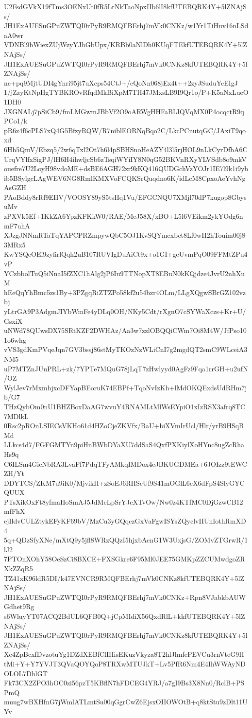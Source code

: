 U2FsdGVkX19fTms3OENxUt0fR5LrNkTaoNpxIIb6lI8kfUTEBQRK4Y+5lZNAjSs/
JH1ExAUESuGPuZWTQI0rPyR9RMQFBErhj7mVk0CNKz/w1Yr1TiHuv16nLSdaA0wr
VDNBl9bWiexZUjWzyYJhGbUpx/KRBb0aNlDh0KUqFTEkfUTEBQRK4Y+5lZNAjSs/
JH1ExAUESuGPuZWTQI0rPyR9RMQFBErhj7mVk0CNKz8kfUTEBQRK4Y+5lZNAjSs/
nc+pq9MjtUDI4gYnri95jt7uXeps54CtJ+/eQoNn068jEx4t++2zyJSuduYcEIgJ
1/jZzyKtNpHgTYBKROvRfqdMkBiXpM7TH47JMxsLB9I9Qr1o/P+K5aNxLueO1DH0
JXGNALj7pSiCb9/fmLMGwmJBbVf2O9oARWgHHFaBLIQVqMX0P4ocqctR9qPCo1/k
pR6z4f6cPLS7xQ4G5BfzyRQW/R7niblEORNqBqo2C/LkcPCnutqGC/JAxiT9qoxd
6Hh5QmV/Ebzq5/2w6qTxl2Ot7h6l4pSBHSnoHeAZY4l3l5rjHOL9nLkCyrDfbA6C
UrqVYlfxSigPJ/lH6H4ihwljcSb6zTsqiWYiIY8N0qG52BKVnRXyYLVSdb8o9mkV
ouefre7U2LoyH98vdoME+dsBE6AGH72zr9kKQ416QUDGchVzYOJr1IE7l9k1i9yb
ib5BSylgcLAgWEV6NG8RmlKMXVoFCQKSrQuqdno6K/idLcM8CpxoAeYvhNgAsGZH
PAoBddy8rRf9EHV/VOOSY89yS5tsHq1Vu/EFGCNQU7XMjl70dP7kugop8GbysuMv
zPXVk5Ef+1KkZA6YpzKFKkW0/RAE/MeJ58X/xBO+L5l6VEikm2ykYOdg6nmF7uhA
XJzgJNNmRTaTqYAPCPRZmpywQbC5OJ1KvSQYmexbct8Lf0wH2hTouim00j83MRx5
KwYSQeOEi9zyfirlQqh2uB107RUVIgDuAiCt9x+o1GI+geUvmPqO09FFMtZPu4vP
YCzbbolTuQ5iNnaI5fZXC1hAlg2jP6Iu9TTNopXT8EBuN0kKQjdze4JvrU2nhXuM
hEeQqYhBmc5zs1By+3PZgqRiZTZPo58kf2u54bzr4OLm/LLgXQgwSBrGZ102vzbj
yLtrGA9P3AdgmJIYbWmFe4yDLq0OH/NKy5Cdt/rXgnO7cSYWaXczs+Kr+U/GsxiX
uNWd78QUwsDX75SRtKZF2DWHAz/Aa3w7zzlOBQQiCWm7Oi8M4W/JfPso101o6whg
vVS3gdKmPVqeJqn7GV3bssj86stMyTKOzNzWLiCnI7g2mgdQT2smC9WLceiA3NM5
uP7MTZnJUuPRL+zk/7YPTe7MQuG78jLqT7zHwlyyd0AgFz9Fqa1rrGH+u2ufN/OZ
WylJev7rMxmhjxcDFYapBEoruK74EBPf+TqoNvIzKh+lMdOKQExdsUdRHm7jb/G7
THzQybOm0nU1BHZBoxDaAG7wvuY4RNAMLtMlWsEYpiO1xIzRSX3afrq8TC7MDlkL
0Rsc2pROnLSIECsVKHo61d4HZoCjeZKVfx/BaU+biXVmIrUcl/Hlr/yrB9HSqBMd
LLkcs4d7/FGFGMTYn9piHnBWbDYaXU7ddSaS4QxfPXKiylXoHYnc8ugZcRhaHs9q
C6ILSm4GicNbRA3LvaFf7PdqTFyAMkqIMDox4eJBKUGDMEa+6JOIzz9tEWCZH/Yt
DDYTCS/ZKM7u9iK0/MjvikH+zSoEJ6RHScUf9S41mOGlL6cX6dFpS4SlyGYCQUUX
PTsXikOxFt8yfmaHoSmAJ5JdMcLpSrYJcXTvOw/Nw0z4KTfMC0DjGzwCB12mfFhX
ejIldvCULZtykEFyKF69bV/MzCu3yGQqczGxVaFgwISYsZQyclvIIUnIothRmXD4
5q+QDzSfyXNe/mXtQ9y5jfl8WRzQQzI5hjxbAcnG1W3UxjsG/ZOMvZTGrwR/1lJ2
7PTOnXOhY58OeSzCi8BXCE+FXSGkre6F95Ml0JEE75GMKpZZCUMwdgoZRXkZZqR5
TZ41xK96ldR5DI/k47EVNCR9RMQFBErhj7mVk0CNKz8kfUTEBQRK4Y+5lZNAjSs/
JH1ExAUESuGPuZWTQI0rPyR9RMQFBErhj7mVk0CNKz+Rpn8VJabkbAUWGdhet9Rg
s6WluyYT07ACQ2BdUL6QFB0Q+jCpMIdiX56QxdRlL+kkfUTEBQRK4Y+5lZNAjSs/
JH1ExAUESuGPuZWTQI0rPyR9RMQFBErhj7mVk0CNKz8kfUTEBQRK4Y+5lZNAjSs/
Xc4ZpBcxfDvzotuYg1DZdXEBfClIHisEKuzVkyza8T2hlJlmfePEVCu3rnVteG9H
tMi+Y+Y7YVJT3QVaQOYQoP8TRXwMTUJkT+Lv5PfR6Nm4E4IhWWAyNDOLOL7DhlGT
Fk73CX2ZPO3hOC0zi56pzT5KBflN7hFDCEG4YRJ/a7gI9Bs3X8Nn0/RclB+PSPmQ
muug7wBXHfnG7jWmlATLmtSu00qGgrCwZ6EjsxOIIOWOtB+q8ktStu9zDlt11UYv
